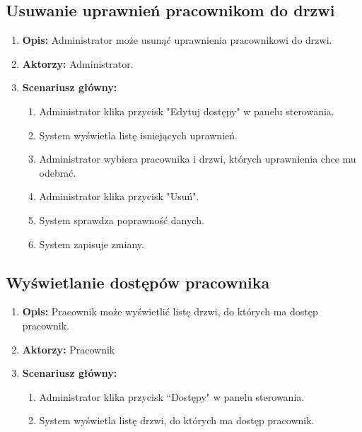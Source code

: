 \subsection{Usuwanie uprawnień pracownikom do drzwi}
\begin{enumerate}
    \item \textbf{Opis:} Administrator może usunąć uprawnienia pracownikowi do drzwi.
    \item \textbf{Aktorzy:} Administrator.
    \item \textbf{Scenariusz główny:} 
    \begin{enumerate}
        \item Administrator klika przycisk "Edytuj dostępy" w panelu sterowania.
        \item System wyświetla listę isniejących uprawnień.
        \item Administrator wybiera pracownika i drzwi, których uprawnienia chce mu odebrać.
        \item Administrator klika przycisk "Usuń".
        \item System sprawdza poprawność danych.
        \item System zapisuje zmiany.
    \end{enumerate}
\end{enumerate}

\subsection{Wyświetlanie dostępów pracownika}
\begin{enumerate}
    \item \textbf{Opis:} Pracownik może wyświetlić listę drzwi, do których ma dostęp pracownik.
    \item \textbf{Aktorzy:} Pracownik
    \item \textbf{Scenariusz główny:} 
    \begin{enumerate}
        \item Administrator klika przycisk ``Dostępy" w panelu sterowania.
        \item System wyświetla listę drzwi, do których ma dostęp pracownik.
    \end{enumerate}
\end{enumerate}

